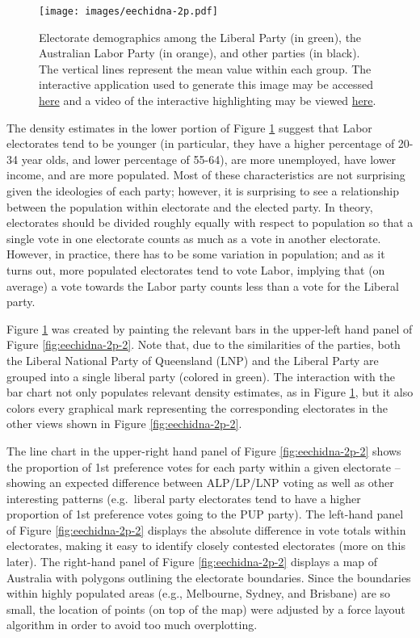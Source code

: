 \documentclass[12pt,]{isuthesis}
\begin{document}
\begin{figure}
\centering
\texttt{[image: images/eechidna-2p.pdf]}
\caption{\label{fig:eechidna-2p}Electorate demographics among the Liberal
Party (in green), the Australian Labor Party (in orange), and other
parties (in black). The vertical lines represent the mean value within
each group. The interactive application used to generate this image may
be accessed \href{http://104.131.111.111:3838/eechidna/}{here} and a
video of the interactive highlighting may be viewed
\href{https://vimeo.com/191553616}{here}.}
\end{figure}

The density estimates in the lower portion of Figure
\ref{fig:eechidna-2p} suggest that Labor electorates tend to be younger
(in particular, they have a higher percentage of 20-34 year olds, and
lower percentage of 55-64), are more unemployed, have lower income, and
are more populated. Most of these characteristics are not surprising
given the ideologies of each party; however, it is surprising to see a
relationship between the population within electorate and the elected
party. In theory, electorates should be divided roughly equally with
respect to population so that a single vote in one electorate counts as
much as a vote in another electorate. However, in practice, there has to
be some variation in population; and as it turns out, more populated
electorates tend to vote Labor, implying that (on average) a vote
towards the Labor party counts less than a vote for the Liberal party.

Figure \ref{fig:eechidna-2p} was created by painting the relevant bars
in the upper-left hand panel of Figure \ref{fig:eechidna-2p-2}. Note
that, due to the similarities of the parties, both the Liberal National
Party of Queensland (LNP) and the Liberal Party are grouped into a
single liberal party (colored in green). The interaction with the bar
chart not only populates relevant density estimates, as in Figure
\ref{fig:eechidna-2p}, but it also colors every graphical mark
representing the corresponding electorates in the other views shown in
Figure \ref{fig:eechidna-2p-2}.

The line chart in the upper-right hand panel of Figure
\ref{fig:eechidna-2p-2} shows the proportion of 1st preference votes for
each party within a given electorate -- showing an expected difference
between ALP/LP/LNP voting as well as other interesting patterns
(e.g.~liberal party electorates tend to have a higher proportion of 1st
preference votes going to the PUP party). The left-hand panel of Figure
\ref{fig:eechidna-2p-2} displays the absolute difference in vote totals
within electorates, making it easy to identify closely contested
electorates (more on this later). The right-hand panel of Figure
\ref{fig:eechidna-2p-2} displays a map of Australia with polygons
outlining the electorate boundaries. Since the boundaries within highly
populated areas (e.g., Melbourne, Sydney, and Brisbane) are so small,
the location of points (on top of the map) were adjusted by a force
layout algorithm in order to avoid too much overplotting.
\end{document}
